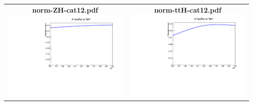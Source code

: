 \begin{longtable}{|c|c|}
{}
 \\
\hline
\parbox{0.49\textwidth}{
\centering
{\bfseries norm-ZH-cat12.pdf}
\includegraphics[width=.49\textwidth]{figures/signal_model/AppendixBdt/norm_ZH_cat12.pdf}
}
 & \parbox{0.49\textwidth}{
\centering
{\bfseries norm-ttH-cat12.pdf}
\includegraphics[width=.49\textwidth]{figures/signal_model/AppendixBdt/norm_ttH_cat12.pdf}
}
 \\
\hline
\end{longtable}
